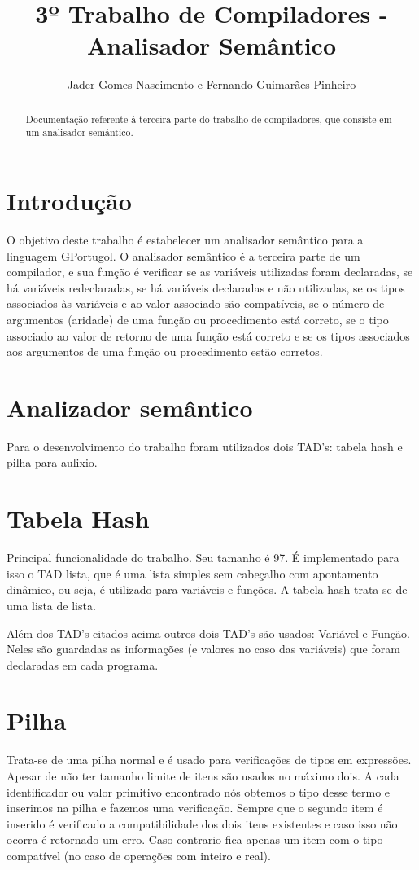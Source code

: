 \documentclass[a4paper,10pt]{article}
\title{3º Trabalho de Compiladores - Analisador Semântico}
\author{Jader Gomes Nascimento e Fernando Guimarães Pinheiro}
\begin{document}
\maketitle

\begin{abstract}
Documentação referente à terceira parte do trabalho de compiladores, que consiste em um analisador semântico.
\end{abstract}

\section{Introdução}
O objetivo deste trabalho é estabelecer um analisador semântico para a linguagem GPortugol. O analisador semântico é a terceira parte
de um compilador, e sua função é verificar se as variáveis utilizadas foram declaradas, se há variáveis redeclaradas, se há variáveis declaradas e não utilizadas, se os tipos associados às variáveis e ao valor associado são compatíveis, se o número de argumentos (aridade) de uma função ou procedimento está correto, se o tipo associado ao valor de retorno de uma função está correto e se os tipos associados aos argumentos de uma função ou procedimento estão corretos.


\section{Analizador semântico}
Para o desenvolvimento do trabalho foram utilizados dois TAD's: tabela hash e pilha para aulixio.

\section{Tabela Hash}
Principal funcionalidade do trabalho. Seu tamanho é 97. É implementado para isso o TAD lista, que é uma lista simples sem cabeçalho com apontamento dinâmico, ou seja, é utilizado para variáveis e funções.
A tabela hash trata-se de uma lista de lista.

Além dos TAD's citados acima outros dois TAD's são usados: Variável e Função. Neles são guardadas as informações (e valores no caso das variáveis) que foram declaradas em cada programa.

\section{Pilha}
Trata-se de uma pilha normal e é usado para verificações de tipos em expressões.
Apesar de não ter tamanho limite de itens são usados no máximo dois. A cada identificador ou valor primitivo encontrado nós obtemos o tipo desse termo e inserimos na pilha e fazemos uma verificação. Sempre que o segundo item é inserido é verificado a compatibilidade dos dois itens existentes e caso isso não ocorra é retornado um erro. Caso contrario fica apenas um item com o tipo compatível (no caso de operações com inteiro e real).
\end{document}
